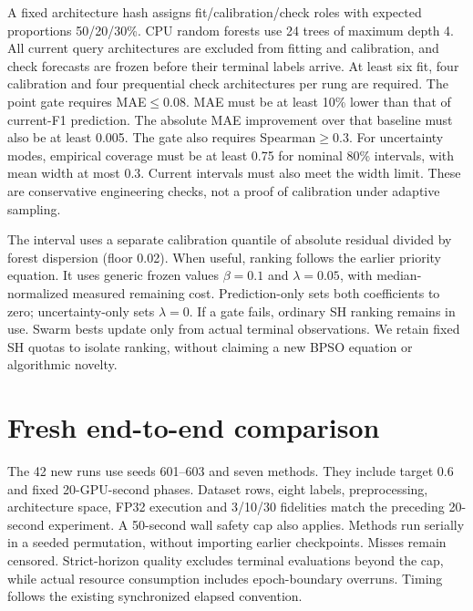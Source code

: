 A fixed architecture hash assigns fit/calibration/check roles with expected proportions 50/20/30\%. CPU random forests use 24 trees of maximum depth 4. All current query architectures are excluded from fitting and calibration, and check forecasts are frozen before their terminal labels arrive. At least six fit, four calibration and four prequential check architectures per rung are required. The point gate requires MAE$\leq0.08$. MAE must be at least 10\% lower than that of current-F1 prediction. The absolute MAE improvement over that baseline must also be at least 0.005. The gate also requires Spearman$\geq0.3$. For uncertainty modes, empirical coverage must be at least 0.75 for nominal 80\% intervals, with mean width at most 0.3. Current intervals must also meet the width limit. These are conservative engineering checks, not a proof of calibration under adaptive sampling.

The interval uses a separate calibration quantile of absolute residual divided by forest dispersion (floor 0.02). When useful, ranking follows the earlier priority equation. It uses generic frozen values $\beta=0.1$ and $\lambda=0.05$, with median-normalized measured remaining cost. Prediction-only sets both coefficients to zero; uncertainty-only sets $\lambda=0$. If a gate fails, ordinary SH ranking remains in use. Swarm bests update only from actual terminal observations. We retain fixed SH quotas to isolate ranking, without claiming a new BPSO equation or algorithmic novelty.

\section{Fresh end-to-end comparison}
The 42 new runs use seeds 601--603 and seven methods. They include target 0.6 and fixed 20-GPU-second phases. Dataset rows, eight labels, preprocessing, architecture space, FP32 execution and 3/10/30 fidelities match the preceding 20-second experiment. A 50-second wall safety cap also applies. Methods run serially in a seeded permutation, without importing earlier checkpoints. Misses remain censored. Strict-horizon quality excludes terminal evaluations beyond the cap, while actual resource consumption includes epoch-boundary overruns. Timing follows the existing synchronized elapsed convention.


